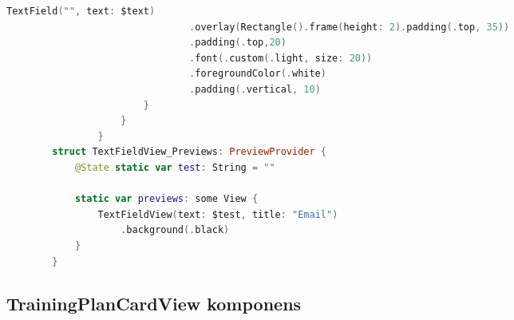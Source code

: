 \begin{spacing}{2}
\end{spacing}
\hspace{-10mm}
\begin{minipage}{\textwidth}
    \linespread{0.8}\selectfont
    \begin{lstlisting}[language=swift]
        TextField("", text: $text)
                                .overlay(Rectangle().frame(height: 2).padding(.top, 35))
                                .padding(.top,20)
                                .font(.custom(.light, size: 20))
                                .foregroundColor(.white)
                                .padding(.vertical, 10)
                        }
                    }
                }
        struct TextFieldView_Previews: PreviewProvider {
            @State static var test: String = ""
            
            static var previews: some View {
                TextFieldView(text: $test, title: "Email")
                    .background(.black)
            }
        }
    \end{lstlisting}   
\end{minipage}

\subsection*{TrainingPlanCardView komponens}

